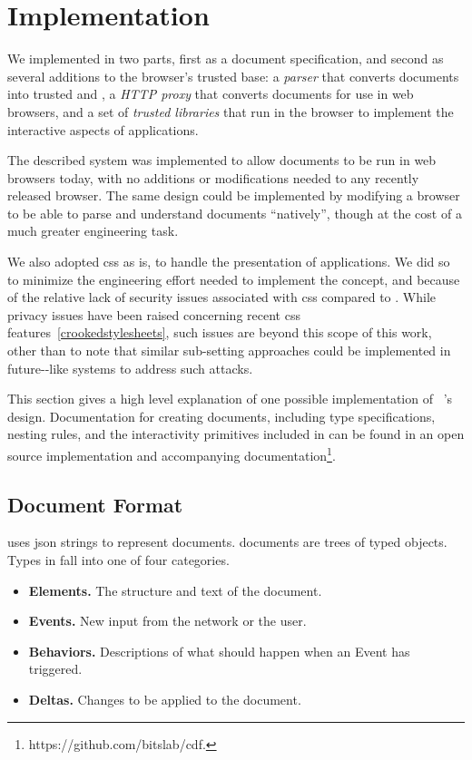 \section{Implementation}
\label{future-web:implementation}

We implemented \CDF in two parts, first as a document specification, and second
as several additions to the browser's trusted base: a \emph{parser} that
converts \CDF documents into trusted \HTML and \JS, a \emph{HTTP proxy} that
converts \CDF documents for use in web browsers, and a set of \emph{trusted \JS
libraries} that run in the browser to implement the interactive aspects of \CDF
applications.

The described system was implemented to allow \CDF documents to be run in web
browsers today, with no additions or modifications needed to any recently
released browser.  The same design could be implemented by modifying a browser
to be able to parse and understand \CDF documents ``natively'', though at the
cost of a much greater engineering task.

We also adopted \gls{css} as is, to handle the presentation
of \CDF applications.  We did so to minimize the engineering effort needed
to implement the \CDF concept, and because of the relative lack of security
issues associated with \gls{css} compared to \JS.  While privacy issues
have been raised concerning recent \gls{css} features~\ref{crookedstylesheets},
such issues are beyond this scope of this work, other than to note
that similar sub-setting approaches could be implemented in future-\CDF-like
systems to address such attacks.

This section gives a high level explanation of one possible implementation
of \CDF~'s design.  Documentation for creating \CDF documents, including
type specifications, nesting rules, and the interactivity primitives
included in \CDF can be found in an open source implementation and accompanying
documentation\footnote{https://github.com/bitslab/cdf.}.

\subsection{Document Format}
\CDF uses \gls{json} strings to represent documents.  \CDF documents are
trees of typed objects.  Types in \CDF fall into one of four categories.

\begin{itemize}[itemsep=-2pt]
  \item \textbf{Elements.} The structure and text of the document.
  \item \textbf{Events.} New input from the network or the user.
  \item \textbf{Behaviors.} Descriptions of what should happen when an Event has
                   triggered.
  \item \textbf{Deltas.} Changes to be applied to the document.
\end{itemize}

